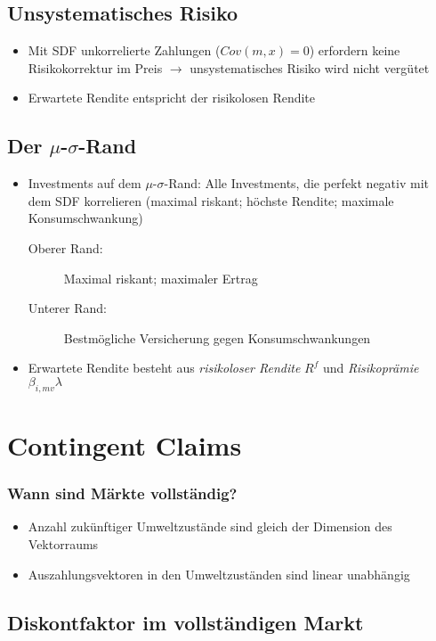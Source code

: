 \subsection{Unsystematisches Risiko}
\begin{itemize}
	\item Mit SDF unkorrelierte Zahlungen (\(Cov(m,x)=0\)) erfordern keine Risikokorrektur im Preis \(\rightarrow\) unsystematisches Risiko wird nicht vergütet
	\item Erwartete Rendite entspricht der risikolosen Rendite
\end{itemize}


\subsection{Der \(\mu\)-\(\sigma\)-Rand}
\begin{itemize}
	\item Investments auf dem \(\mu\)-\(\sigma\)-Rand: Alle Investments, die perfekt negativ mit dem SDF korrelieren (maximal riskant; höchste Rendite; maximale Konsumschwankung)
	\begin{description}
		\item[Oberer Rand:] Maximal riskant; maximaler Ertrag
		\item[Unterer Rand:] Bestmögliche Versicherung gegen Konsumschwankungen
	\end{description}
	\item Erwartete Rendite besteht aus \textit{risikoloser Rendite} \(R^f\) und \textit{Risikoprämie} \(\beta_{i,mv}\lambda\)
\end{itemize}



\section{Contingent Claims}

\subsubsection{Wann sind Märkte vollständig?}
\begin{itemize}
	\item Anzahl zukünftiger Umweltzustände sind gleich der Dimension des Vektorraums
	\item Auszahlungsvektoren in den Umweltzuständen sind linear unabhängig
\end{itemize}


\subsection{Diskontfaktor im vollständigen Markt}


